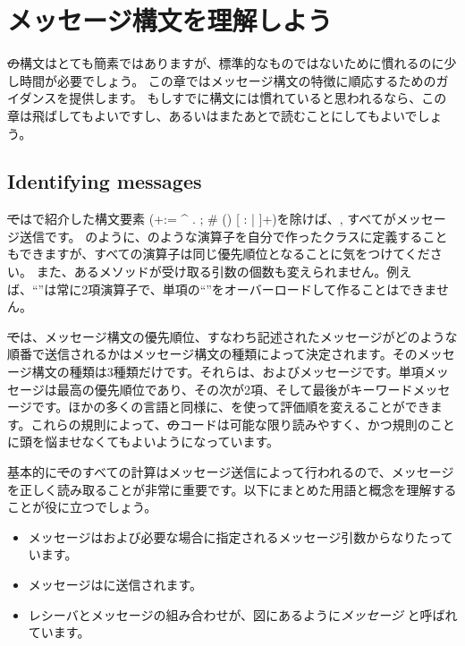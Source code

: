 \documentclass[a4paper,10pt,twoside]{book}
\begin{document}
	\renewcommand{\nnbb}[2]{} %
	\sloppy
\fi
\chapter{メッセージ構文を理解しよう}

\st の構文はとても簡素ではありますが、標準的なものではないために慣れるのに少し時間が必要でしょう。
この章ではメッセージ構文の特徴に順応するためのガイダンスを提供します。
もしすでに構文には慣れていると思われるなら、この章は飛ばしてもよいですし、あるいはまたあとで読むことにしてもよいでしょう。

\section{Identifying messages}

\st ではで紹介した構文要素 (\ct+:= ^ . ; # () {} [ : | ]+)を除けば、, すべてがメッセージ送信です。
のように、\ct{+}のような演算子を自分で作ったクラスに定義することもできますが、すべての演算子は同じ優先順位となることに気をつけてください。
また、あるメソッドが受け取る引数の個数も変えられません。例えば、``\ct{-}''は常に2項演算子で、単項の``\ct{-}''をオーバーロードして作ることはできません。

\st では、メッセージ構文の優先順位、すなわち記述されたメッセージがどのような順番で送信されるかはメッセージ構文の種類によって決定されます。そのメッセージ構文の種類は3種類だけです。それらは、およびメッセージです。単項メッセージは最高の優先順位であり、その次が2項、そして最後がキーワードメッセージです。ほかの多くの言語と同様に、を使って評価順を変えることができます。これらの規則によって、\st のコードは可能な限り読みやすく、かつ規則のことに頭を悩ませなくてもよいようになっています。

基本的に\st でのすべての計算はメッセージ送信によって行われるので、メッセージを正しく読み取ることが非常に重要です。以下にまとめた用語と概念を理解することが役に立つでしょう。

\begin{itemize}
  \item メッセージはおよび必要な場合に指定されるメッセージ引数からなりたっています。
  \item メッセージはに送信されます。
  \item レシーバとメッセージの組み合わせが、図にあるように\emph{メッセージ} と呼ばれています。
\end{itemize}
\end{document}
